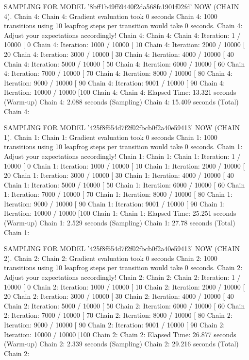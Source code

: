 \documentclass[
]{jss}
\begin{document}
\begin{CodeChunk}
\begin{CodeOutput}
SAMPLING FOR MODEL '8bff1b49f59440f2da568fc1901f02fd' NOW (CHAIN 4).
Chain 4: 
Chain 4: Gradient evaluation took 0 seconds
Chain 4: 1000 transitions using 10 leapfrog steps per transition would take 0 seconds.
Chain 4: Adjust your expectations accordingly!
Chain 4: 
Chain 4: 
Chain 4: Iteration:    1 / 10000 [  0%
Chain 4: Iteration: 1000 / 10000 [ 10%
Chain 4: Iteration: 2000 / 10000 [ 20%
Chain 4: Iteration: 3000 / 10000 [ 30%
Chain 4: Iteration: 4000 / 10000 [ 40%
Chain 4: Iteration: 5000 / 10000 [ 50%
Chain 4: Iteration: 6000 / 10000 [ 60%
Chain 4: Iteration: 7000 / 10000 [ 70%
Chain 4: Iteration: 8000 / 10000 [ 80%
Chain 4: Iteration: 9000 / 10000 [ 90%
Chain 4: Iteration: 9001 / 10000 [ 90%
Chain 4: Iteration: 10000 / 10000 [100%
Chain 4: 
Chain 4:  Elapsed Time: 13.321 seconds (Warm-up)
Chain 4:                2.088 seconds (Sampling)
Chain 4:                15.409 seconds (Total)
Chain 4: 

SAMPLING FOR MODEL '425f8f654d7f2f02fbcb0f2a40e59413' NOW (CHAIN 1).
Chain 1: 
Chain 1: Gradient evaluation took 0 seconds
Chain 1: 1000 transitions using 10 leapfrog steps per transition would take 0 seconds.
Chain 1: Adjust your expectations accordingly!
Chain 1: 
Chain 1: 
Chain 1: Iteration:    1 / 10000 [  0%
Chain 1: Iteration: 1000 / 10000 [ 10%
Chain 1: Iteration: 2000 / 10000 [ 20%
Chain 1: Iteration: 3000 / 10000 [ 30%
Chain 1: Iteration: 4000 / 10000 [ 40%
Chain 1: Iteration: 5000 / 10000 [ 50%
Chain 1: Iteration: 6000 / 10000 [ 60%
Chain 1: Iteration: 7000 / 10000 [ 70%
Chain 1: Iteration: 8000 / 10000 [ 80%
Chain 1: Iteration: 9000 / 10000 [ 90%
Chain 1: Iteration: 9001 / 10000 [ 90%
Chain 1: Iteration: 10000 / 10000 [100%
Chain 1: 
Chain 1:  Elapsed Time: 25.251 seconds (Warm-up)
Chain 1:                2.529 seconds (Sampling)
Chain 1:                27.78 seconds (Total)
Chain 1: 

SAMPLING FOR MODEL '425f8f654d7f2f02fbcb0f2a40e59413' NOW (CHAIN 2).
Chain 2: 
Chain 2: Gradient evaluation took 0 seconds
Chain 2: 1000 transitions using 10 leapfrog steps per transition would take 0 seconds.
Chain 2: Adjust your expectations accordingly!
Chain 2: 
Chain 2: 
Chain 2: Iteration:    1 / 10000 [  0%
Chain 2: Iteration: 1000 / 10000 [ 10%
Chain 2: Iteration: 2000 / 10000 [ 20%
Chain 2: Iteration: 3000 / 10000 [ 30%
Chain 2: Iteration: 4000 / 10000 [ 40%
Chain 2: Iteration: 5000 / 10000 [ 50%
Chain 2: Iteration: 6000 / 10000 [ 60%
Chain 2: Iteration: 7000 / 10000 [ 70%
Chain 2: Iteration: 8000 / 10000 [ 80%
Chain 2: Iteration: 9000 / 10000 [ 90%
Chain 2: Iteration: 9001 / 10000 [ 90%
Chain 2: Iteration: 10000 / 10000 [100%
Chain 2: 
Chain 2:  Elapsed Time: 26.877 seconds (Warm-up)
Chain 2:                2.339 seconds (Sampling)
Chain 2:                29.216 seconds (Total)
Chain 2: 


\end{CodeOutput}
\end{CodeChunk}
\end{document}
